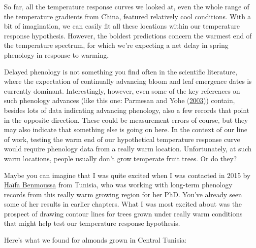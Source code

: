 \documentclass[
]{book}
\begin{document}
So far, all the temperature response curves we looked at, even the whole range of the temperature gradients from China, featured relatively cool conditions. With a bit of imagination, we can easily fit all these locations within our temperature response hypothesis. However, the boldest predictions concern the warmest end of the temperature spectrum, for which we're expecting a net delay in spring phenology in response to warming.

Delayed phenology is not something you find often in the scientific literature, where the expectation of continually advancing bloom and leaf emergence dates is currently dominant. Interestingly, however, even some of the key references on such phenology advances (like this one: Parmesan and Yohe (\protect\hyperlink{ref-parmesan2003globally}{2003})) contain, besides lots of data indicating advancing phenology, also a few records that point in the opposite direction. These could be measurement errors of course, but they may also indicate that something else is going on here. In the context of our line of work, testing the warm end of our hypothetical temperature response curve would require phenology data from a really warm location. Unfortunately, at such warm locations, people usually don't grow temperate fruit trees. Or do they?

Maybe you can imagine that I was quite excited when I was contacted in 2015 by \href{https://scholar.google.com/citations?user=DdV9jsAAAAAJ\&hl}{Haïfa Benmoussa} from Tunisia, who was working with long-term phenology records from this really warm growing region for her PhD. You've already seen some of her results in earlier chapters. What I was most excited about was the prospect of drawing contour lines for trees grown under really warm conditions that might help test our temperature response hypothesis.

Here's what we found for almonds grown in Central Tunisia:
\end{document}
